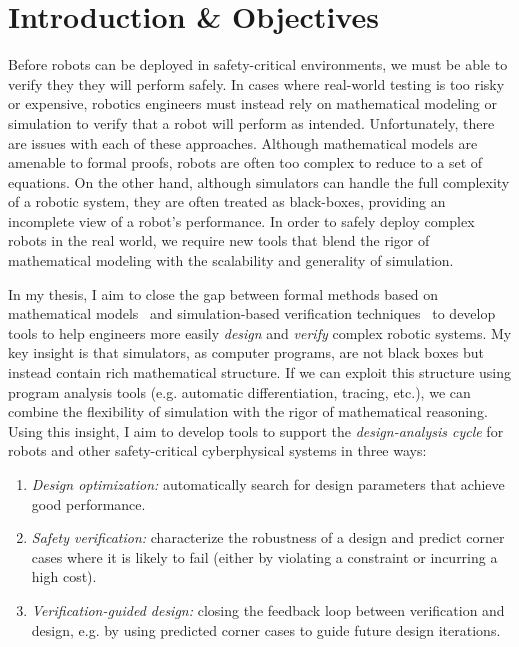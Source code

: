 
\section{Introduction \& Objectives}\label{section:introduction}

Before robots can be deployed in safety-critical environments, we must be able to verify they they will perform safely. In cases where real-world testing is too risky or expensive, robotics engineers must instead rely on mathematical modeling or simulation to verify that a robot will perform as intended. Unfortunately, there are issues with each of these approaches. Although mathematical models are amenable to formal proofs, robots are often too complex to reduce to a set of equations. On the other hand, although simulators can handle the full complexity of a robotic system, they are often treated as black-boxes, providing an incomplete view of a robot's performance. In order to safely deploy complex robots in the real world, we require new tools that blend the rigor of mathematical modeling with the scalability and generality of simulation.

In my thesis, I aim to close the gap between formal methods based on mathematical models~\cite{beltaFormalMethodsControl2019,kress-gazitSynthesisRobotsGuarantees2018} and simulation-based verification techniques~\cite{zhouRoCUSRobotController2021,corsoSurveyAlgorithmsBlackBox2021a,okellyScalableEndtoEndAutonomous2018a} to develop tools to help engineers more easily \textit{design} and \textit{verify} complex robotic systems. My key insight is that simulators, as computer programs, are not black boxes but instead contain rich mathematical structure. If we can exploit this structure using program analysis tools (e.g. automatic differentiation, tracing, etc.), we can combine the flexibility of simulation with the rigor of mathematical reasoning.
%
Using this insight, I aim to develop tools to support the \textit{design-analysis cycle} for robots and other safety-critical cyberphysical systems in three ways:
\begin{enumerate}
    \item \textit{Design optimization:} automatically search for design parameters that achieve good performance.
    \item \textit{Safety verification:} characterize the robustness of a design and predict corner cases where it is likely to fail (either by violating a constraint or incurring a high cost).
    \item \textit{Verification-guided design:} closing the feedback loop between verification and design, e.g. by using predicted corner cases to guide future design iterations.
\end{enumerate}

